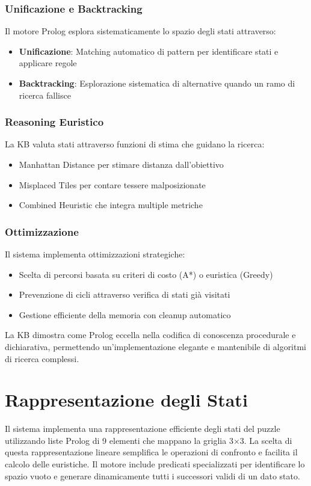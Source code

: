 \documentclass[12pt,a4paper]{report}
\theoremstyle{definition}
\begin{document}
\subsubsection{Unificazione e Backtracking}
Il motore Prolog esplora sistematicamente lo spazio degli stati attraverso:
\begin{itemize}
    \item \textbf{Unificazione}: Matching automatico di pattern per identificare stati e applicare regole
    \item \textbf{Backtracking}: Esplorazione sistematica di alternative quando un ramo di ricerca fallisce
\end{itemize}

\subsubsection{Reasoning Euristico}
La KB valuta stati attraverso funzioni di stima che guidano la ricerca:
\begin{itemize}
    \item Manhattan Distance per stimare distanza dall'obiettivo
    \item Misplaced Tiles per contare tessere malposizionate
    \item Combined Heuristic che integra multiple metriche
\end{itemize}

\subsubsection{Ottimizzazione}
Il sistema implementa ottimizzazioni strategiche:
\begin{itemize}
    \item Scelta di percorsi basata su criteri di costo (A*) o euristica (Greedy)
    \item Prevenzione di cicli attraverso verifica di stati già visitati
    \item Gestione efficiente della memoria con cleanup automatico
\end{itemize}

La KB dimostra come Prolog eccella nella codifica di conoscenza procedurale e dichiarativa, permettendo un'implementazione elegante e mantenibile di algoritmi di ricerca complessi.

\section{Rappresentazione degli Stati}
Il sistema implementa una rappresentazione efficiente degli stati del puzzle utilizzando liste Prolog di 9 elementi che mappano la griglia 3×3. La scelta di questa rappresentazione lineare semplifica le operazioni di confronto e facilita il calcolo delle euristiche. Il motore include predicati specializzati per identificare lo spazio vuoto e generare dinamicamente tutti i successori validi di un dato stato.
\end{document}
